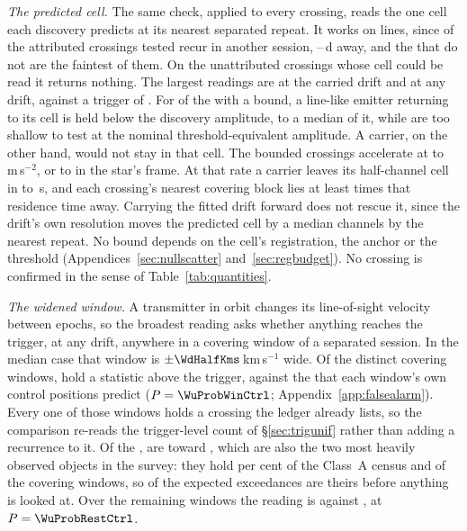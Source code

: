 \emph{The predicted cell.} The same check, applied to every crossing, reads
the one cell each discovery predicts at its nearest separated repeat. It
works on lines, since \MkAttrRecur{} of the \MkAttrTested{} attributed
crossings tested recur in another session, \QcSepMinD--\QcSepMaxD\,d away, and the
\MkAttrExcl{} that do not are the faintest of them. On the \RcNExclPoss{}
unattributed crossings whose cell could be read it returns nothing. The
largest readings are \RcTMatched{} at the carried drift and \RcTMax{} at any
drift, against a trigger of \StageNullTrig. For \RcNFracBelow{} of the \RcNExcl{} with a
bound, a line-like emitter returning to its cell is held below the discovery
amplitude, to a median \RcFracMed{} of it, while \HjNPowerLo{} are too
shallow to test at the nominal threshold-equivalent amplitude. A carrier, on
the other hand, would not stay in that cell. The bounded crossings
accelerate at \ZtALosLo{} to \ZtALosHi\,m\,s$^{-2}$, or \EgExStarALosLo{} to
\EgStarALosHi{} in the star's frame. At that rate a carrier leaves its
half-channel cell in \ZtLeaveSecLo{} to \ZtLeaveSecHi\,s, and each
crossing's nearest covering block lies at least \ZtGapOverLeaveMin{} times
that residence time away. Carrying the fitted drift forward does not rescue it, since
the drift's own resolution moves the predicted cell by a median
\ZtRegChanMed{} channels by the nearest repeat. No bound depends on the
cell's registration, the anchor or the threshold
(Appendices~\ref{sec:nullscatter} and~\ref{sec:regbudget}).
\RcNoRepeatSentence{} No crossing is confirmed in the sense of
Table~\ref{tab:quantities}.

\emph{The widened window.} A transmitter in orbit changes its line-of-sight
velocity between epochs, so the broadest reading asks whether anything
reaches the trigger, at any drift, anywhere in a covering window of a
separated session. In the median case that window is
$\pm\WdHalfKms$\,km\,s$^{-1}$ wide. Of the \WuNWin{} distinct covering
windows, \WuNWinExc{} hold a statistic above the trigger, against the
\WuExpWinCtrl{} that each window's own control positions predict
($P=\WuProbWinCtrl$; Appendix~\ref{app:falsealarm}). Every one of those
windows holds a crossing the ledger already lists, so the comparison
re-reads the trigger-level count of \S\ref{sec:trigunif} rather than adding
a recurrence to it. Of the \WuNWinExc, \WuNWinExcTwo{} are toward
\WuTwoStars, which are also the two most heavily observed objects in the
survey: they hold \TwWinASharePct{} per cent of the Class~A census and
\TwNWinTwo{} of the \WuNWin{} covering windows, so \TwExpTwoCtrl{} of the
\WuExpWinCtrl{} expected exceedances are theirs before anything is looked
at. Over the remaining \WuNWinRest{} windows the reading is
\WuNWinRestExc{} against \WuExpRestCtrl, at $P=\WuProbRestCtrl$.

